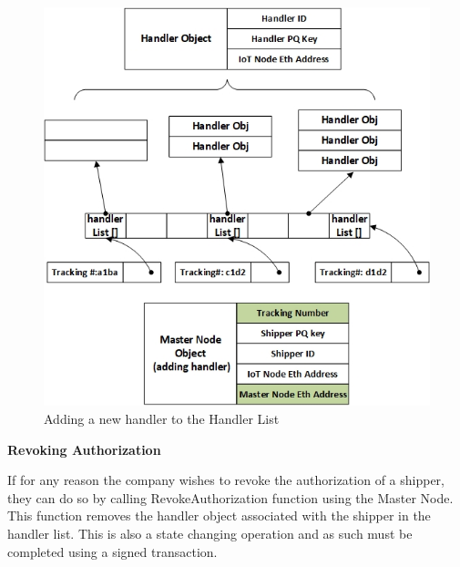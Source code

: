 \begin{figure}[h]
	\centering
    \includegraphics[width=120mm,scale=1]{figs/handler-impl}
	\caption{Adding a new handler to the Handler List}
	\label{fig:handler-impl} 
\end{figure}
\vspace{0.1cm}
\textbf{Revoking Authorization}

If for any reason the company wishes to revoke the authorization of a shipper, they can do so by calling RevokeAuthorization function using the Master Node. This function removes the handler object associated with the shipper in the handler list. This is also a state changing operation and as such must be completed using a signed transaction.

\vspace{0.5cm}

